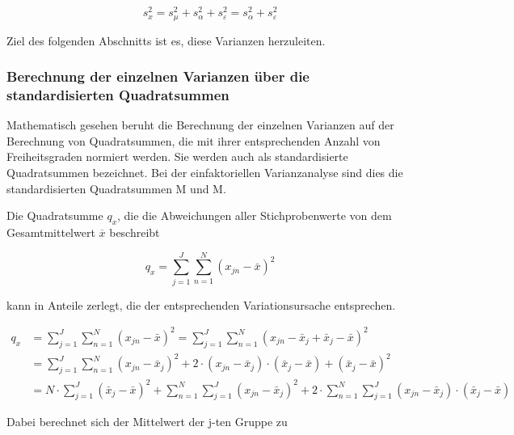 \begin{equation}\label{eq:ninefour}
s_{x}^{2} =s_{\mu }^{2} +s_{\alpha }^{2} +s_{\varepsilon }^{2} =s_{\alpha }^{2} +s_{\varepsilon }^{2}
\end{equation}

\noindent Ziel des folgenden Abschnitts ist es, diese Varianzen herzuleiten.

\subsubsection{Berechnung der einzelnen Varianzen \"{u}ber die standardisierten Quadratsummen}

\noindent Mathematisch gesehen beruht die Berechnung der einzelnen Varianzen auf der Berechnung von Quadratsummen, die mit ihrer entsprechenden Anzahl von Freiheitsgraden normiert werden. Sie werden auch als standardisierte Quadratsummen bezeichnet. Bei der einfaktoriellen Varianzanalyse sind dies die standardisierten Quadratsummen M und M.\newline

\noindent Die Quadratsumme $q_{x}$, die die Abweichungen aller Stichprobenwerte von dem Gesamtmittelwert $\overline{x}$ beschreibt

\begin{equation}\label{eq:ninefive}
q_{x} =\sum _{j=1}^{J}\sum _{n=1}^{N}(x_{jn} -\bar{x})^{2}
\end{equation}

\noindent kann in Anteile zerlegt, die der entsprechenden Variationsursache entsprechen.

\begin{equation}\label{eq:ninesix}
\begin{split}
q_{x} & = \sum _{j=1}^{J}\sum _{n=1}^{N}(x_{jn} -\bar{x})^{2}   =\sum _{j=1}^{J}\sum _{n=1}^{N}(x_{jn} -\bar{x}_{j} +\bar{x}_{j} -\bar{x})^{2}\\
& = \sum _{j=1}^{J}\sum _{n=1}^{N}(x_{jn} -\bar{x}_{j})^{2} +2\cdot (x_{jn} -\bar{x}_{j})\cdot (\bar{x}_{j} -\bar{x}) + (\bar{x}_{j} -\bar{x}) ^{2}\\
& = N\cdot \sum _{j=1}^{J}(\bar{x}_{j} -\bar{x}) ^{2} + \sum _{n=1}^{N}\sum _{j=1}^{J}(x_{jn} -\bar{x}_{j})^{2} + 2\cdot \sum _{n=1}^{N}\sum _{j=1}^{J}(x_{jn} -\bar{x}_{j})\cdot (\bar{x}_{j} -\bar{x})
\end{split}
\end{equation}

\noindent Dabei berechnet sich der Mittelwert der j-ten Gruppe zu 

